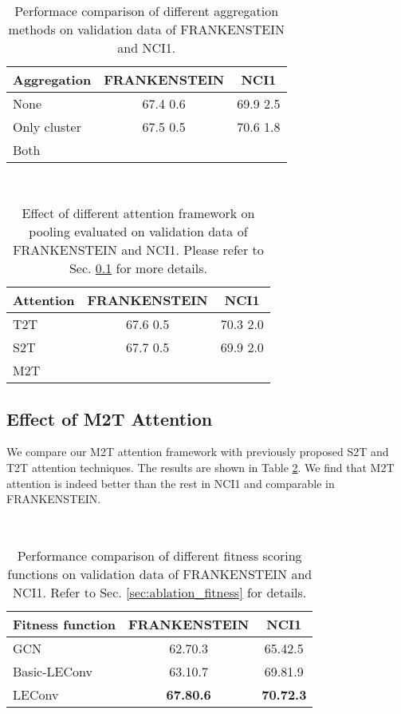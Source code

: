 \documentclass[letterpaper]{article} \usepackage{aaai20}  \usepackage{times}  \usepackage{helvet} \usepackage{courier}  \usepackage[hyphens]{url}  \usepackage{graphicx} \urlstyle{rm} \def\UrlFont{\rm}  \usepackage{graphicx}  \frenchspacing  \setlength{\pdfpagewidth}{8.5in}  \setlength{\pdfpageheight}{11in}
\begin{document}
\begin{table}[!tbh]\
	\centering
	\begin{tabular}{lcc}
		\toprule
		Aggregation & \textsc{FRANKENSTEIN} & \textsc{NCI1} \\
		\midrule
		None & 67.4 0.6 & 69.9  2.5\\
		Only cluster & 67.5 0.5 & 70.6  1.8\\
		Both &  &  \\
		\bottomrule
	\end{tabular}
	\caption{\label{tab:aggregation} Performace comparison of different aggregation methods on validation data of FRANKENSTEIN and NCI1.}
\end{table}

\begin{table}[!tbh]\
	\centering
	\begin{tabular}{lcc}
		\toprule
		Attention & \textsc{FRANKENSTEIN} & \textsc{NCI1} \\
		\midrule
		T2T & 67.6  0.5 & 70.3  2.0 \\
		S2T & 67.7  0.5 & 69.9  2.0 \\
		M2T &  &  \\
		\bottomrule
	\end{tabular}
	\caption{\label{tab:attention} Effect of different attention framework on pooling evaluated on validation data of FRANKENSTEIN and NCI1. Please refer to Sec. \ref{sec:ablation_attn} for more details.}
\end{table}

\subsection{Effect of M2T Attention}
\label{sec:ablation_attn}
We compare our M2T attention framework with previously proposed S2T and T2T attention techniques. The results are shown in Table \ref{tab:attention}. We find that M2T attention is indeed better than the rest in NCI1 and comparable in FRANKENSTEIN.

\begin{table}[!ht]\
	\centering
	\begin{tabular}{lcc}
		\toprule
		Fitness function & \textsc{FRANKENSTEIN} & \textsc{NCI1} \\
		\midrule
		GCN & 62.70.3 & 65.42.5 \\
		Basic-LEConv & 63.10.7 & 69.81.9 \\
		LEConv & \textbf{67.80.6} & \textbf{70.72.3} \\
		\bottomrule
	\end{tabular}
	\caption{\label{tab:leconv} Performance comparison of different fitness scoring functions on validation data of FRANKENSTEIN and NCI1. Refer to Sec. \ref{sec:ablation_fitness} for details.}
\end{table}
\end{document}
